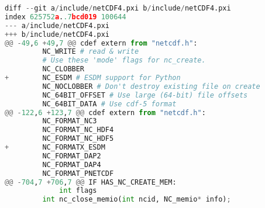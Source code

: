 \begin{lstlisting}[language=python,upquote=true]
diff --git a/include/netCDF4.pxi b/include/netCDF4.pxi
index 625752a..7bcd019 100644
--- a/include/netCDF4.pxi
+++ b/include/netCDF4.pxi
@@ -49,6 +49,7 @@ cdef extern from "netcdf.h":
         NC_WRITE # read & write
         # Use these 'mode' flags for nc_create.
         NC_CLOBBER
+        NC_ESDM # ESDM support for Python
         NC_NOCLOBBER # Don't destroy existing file on create
         NC_64BIT_OFFSET # Use large (64-bit) file offsets
         NC_64BIT_DATA # Use cdf-5 format
@@ -122,6 +123,7 @@ cdef extern from "netcdf.h":
         NC_FORMAT_NC3
         NC_FORMAT_NC_HDF4
         NC_FORMAT_NC_HDF5
+        NC_FORMATX_ESDM
         NC_FORMAT_DAP2
         NC_FORMAT_DAP4
         NC_FORMAT_PNETCDF
@@ -704,7 +706,7 @@ IF HAS_NC_CREATE_MEM:
             int flags
         int nc_close_memio(int ncid, NC_memio* info);


\end{lstlisting}
